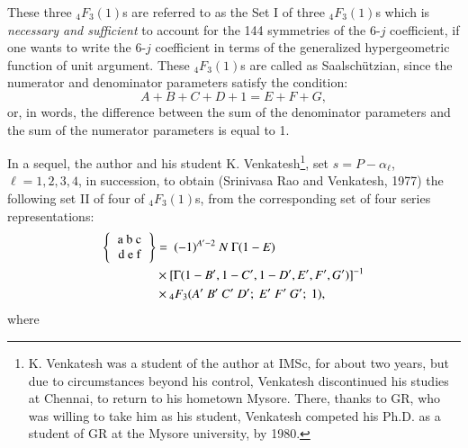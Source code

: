 These three ${}_4F_3(1)$s are referred to as the Set I of three ${}_4F_3(1)$s which is \textit{necessary and sufficient} to account for the 144 symmetries of the 6-$j$ coefficient, if one wants to write the 6-$j$ coefficient in terms of the generalized hypergeometric function of unit argument. These ${}_4F_3(1)$s are called as Saalschützian, since the numerator and denominator parameters satisfy the condition:
\begin{equation}
A+B+C+D+1 = E+F+G, \label{chap7-eq36}
\end{equation}
or, in words, the difference between the sum of the denominator parameters and the sum of the numerator parameters is equal to 1.

In a sequel, the author and his student K. Venkatesh\footnote{K. Venkatesh was a student of the author at IMSc, for about two years, but due to circumstances beyond his control, Venkatesh discontinued his studies at Chennai, to return to his hometown Mysore. There, thanks to GR, who was willing to take him as his student, Venkatesh competed his Ph.D. as a student of GR at the Mysore university, by 1980.}, set $s = P-\alpha_\ell$, $\ell=1,2,3,4$, in succession, to obtain (Srinivasa Rao and Venkatesh, 1977) the following set II of four of $_4F_3(1)$s, from the corresponding set of four series representations:
\begin{equation}
\begin{split}
\left\{
\begin{tabular} {c} 
a\ b\ c\\ 
d\ e\ f \\ 
\end{tabular} 
\right\}
& = \ (-1)^{A'-2}\ N\ \Gamma(1-E)\\
& \times [\Gamma(1-B', 1-C', 1-D', E', F', G')]^{-1}\\
& \times {}_4F_3(A'\ B'\ C'\ D';\ E'\ F'\ G';\ 1), \label{chap7-eq37}
\end{split}
\end{equation}
where
